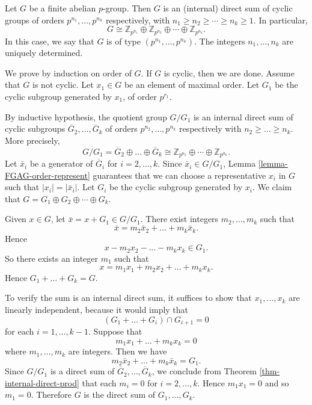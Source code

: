 \begin{theorem} \label{thm-1.3.11}
	Let $G$ be a finite abelian $p$-group. Then $G$ is an (internal) direct sum of cyclic groups of orders $p^{n_1},\dots, p^{n_k}$ respectively, with $n_1\geq n_2\geq\cdots\geq n_k\geq 1$. In particular,
	\begin{equation*}
		G \cong \mathbb{Z}_{p^{n_1}} \oplus \mathbb{Z}_{p^{n_2}} \oplus \cdots \oplus \mathbb{Z}_{p^{n_k}}.
	\end{equation*}
	In this case, we say that $G$ is of type $(p^{n_1},\dots, p^{n_k})$. The integers $n_1,\dots, n_k$ are uniquely determined.
\end{theorem}
\begin{sketch}
 We prove by induction on order of $G$. If $G$ is cyclic, then we are done. Assume that $G$ is not cyclic. Let $x_1 \in G$ be an element of maximal order. Let $G_1$ be the cyclic subgroup generated by $x_1$, of order $p^{r_1}$. 
	
By inductive hypothesis, the quotient group $G/G_1$ is an internal direct sum of cyclic subgroups $\overline{G}_2,\dots, \overline{G}_k$ of orders $p^{n_2}, \dots, p^{n_k}$ respectively with $n_2 \ge \dots \ge n_k$. More precisely, 
	$$ G/G_1 = \overline{G}_2 \oplus \dots \oplus \overline{G}_k \cong \mathbb{Z}_{p^{n_2}}\oplus \cdots \oplus \mathbb{Z}_{p^{n_k}}.$$
Let $\bar{x}_i$ be a generator of $\overline{G}_i$ for $i=2, \dots, k$. Since $\bar{x}_i \in G/G_1$, Lemma \ref{lemma-FGAG-order-represent} guarantees that we can choose  a representative $x_i$  in $G$ such that $|x_i | = |\bar{x}_i|$. Let $G_i$ be the cyclic subgroup generated by $x_i$. We claim that $G = G_1\oplus G_2\oplus \cdots \oplus G_k$.
	
	Given $x \in G$, let $\bar{x} = x + G_1\in G/G_1$. There exist integers $m_2,\dots, m_k$ such that
	$$ \bar{x} = m_2 \bar{x}_2 + \dots + m_k \bar{x}_k. $$
	Hence 
	\begin{equation*}
		x - m_2 x_2 - \dots - m_k x_k \in G_1.
	\end{equation*} So there exists an integer $m_1$ such that
	$$ x = m_1 x_1 + m_2 x_2 + \dots + m_k x_k. $$
	Hence $G_1 + \dots + G_k = G$.
	
To verify the sum is an internal direct sum, it suffices to show that $x_1,\dots, x_k$ are linearly independent, because it would imply that $$ (G_1 + \dots + G_i) \cap G_{i+1} = 0 $$
for each $i = 1,\dots,k-1$. Suppose that 
	$$ m_1 x_1 + \dots + m_k x_k = 0$$
	where $m_1,\dots, m_k$ are integers. Then we have 
	$$m_2 \bar{x}_2 + \dots + m_k \bar{x}_k = G_1.$$
	Since $G/G_1$ is a direct sum of $\overline{G}_2, \dots, \overline{G}_k$,  we conclude from Theorem \ref{thm-internal-direct-prod} that each $m_i=0$ for $i=2, \dots, k$. Hence $m_1 x_1 = 0$ and so   $m_1=0$. Therefore $G$ is the direct sum of $G_1, \dots, G_k$.
	

\end{sketch}

